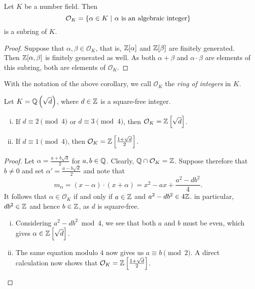 \begin{posledica}
Let $K$ be a number field. Then
\[
\mathcal{O}_K =
\left\{\alpha \in K~\middle\vert~\text{$\alpha$ is an algebraic integer}\right\}
\]
is a subring of $K$.
\end{posledica}

\begin{proof}
Suppose that $\alpha, \beta \in \mathcal{O}_K$, that is,
$\mathbb{Z}[\alpha]$ and $\mathbb{Z}[\beta]$ are finitely generated. Then
$\mathbb{Z}[\alpha, \beta]$ is finitely generated as well. As both
$\alpha + \beta$ and $\alpha \cdot \beta$ are elements of this
subring, both are elements of $\mathcal{O}_K$.
\end{proof}

\begin{definicija}
With the notation of the above corollary, we call $\mathcal{O}_K$
the \emph{ring of integers} in $K$.
\end{definicija}

\begin{trditev}
Let $K = \mathbb{Q} \left(\sqrt{d}\right)$, where $d \in \mathbb{Z}$ is a square-free
integer.

\begin{enumerate}[i)]
\item If $d \equiv 2 \pmod{4}$ or $d \equiv 3 \pmod{4}$, then
$\mathcal{O}_K = \mathbb{Z} \left[\sqrt{d}\right]$.
\item If $d \equiv 1 \pmod{4}$, then
$\mathcal{O}_K = \mathbb{Z} \left[\frac{1+\sqrt{d}}{2}\right]$.
\end{enumerate}
\end{trditev}

\begin{proof}
Let $\alpha = \frac{a + b \sqrt{d}}{2}$ for $a, b \in \mathbb{Q}$. Clearly,
$\mathbb{Q} \cap \mathcal{O}_K = \mathbb{Z}$. Suppose therefore that $b \ne 0$ and
set $\alpha' = \frac{a - b \sqrt{d}}{2}$ and note that
\[
m_\alpha =
(x - \alpha) \cdot (x + \alpha) =
x^2 - ax + \frac{a^2 - db^2}{4}.
\]
It follows that $\alpha \in \mathcal{O}_K$ if and only if
$a \in \mathbb{Z}$ and $a^2 - db^2 \in 4\mathbb{Z}$. in particular, $db^2 \in \mathbb{Z}$
and hence $b \in \mathbb{Z}$, as $d$ is square-free.

\begin{enumerate}[i)]
\item Considering $a^2 - d b^2 \bmod 4$, we see that both $a$ and
$b$ must be even, which gives
$\alpha \in \mathbb{Z} \left[\sqrt{d}\right]$.
\item The same equation modulo $4$ now gives us
$a \equiv b \pmod{2}$. A direct calculation now shows that
$\mathcal{O}_K = \mathbb{Z} \left[\frac{1+\sqrt{d}}{2}\right]$. \qedhere
\end{enumerate}
\end{proof}

